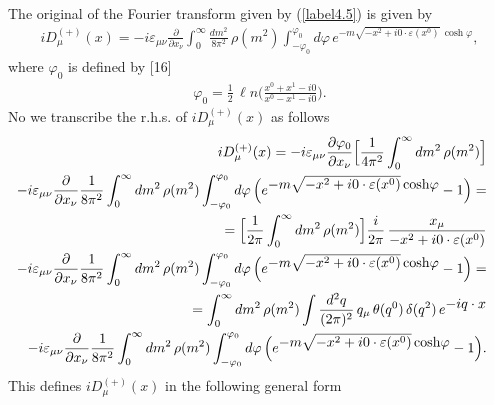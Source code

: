 \documentclass[a4paper,12pt] {article}
\begin{document}
The original of the Fourier transform given by (\ref{label4.5}) is
given by
%
\begin{eqnarray}\label{label4.8}
iD^{(+)}_{\mu}(x) = -i
\varepsilon_{\mu\nu}\frac{\partial}{\partial
x_{\nu}}\int^{\infty}_0\frac{dm^2}{8\pi^2}\,\rho(m^2)
\int^{\varphi_0}_{-\varphi_0}d\varphi\,e^{\textstyle -m\sqrt{-x^2 +
i0\cdot \varepsilon(x^0)}\,{\cosh}\varphi},
\end{eqnarray}
%
where $\varphi_0$ is defined by [16] 
%
\begin{eqnarray}\label{label4.9}
\varphi_0 = \frac{1}{2}\,{\ell n}\Big(\frac{x^0 + x^1 - i0}{x^0 - x^1
- i0}\Big).
\end{eqnarray}
%
No we transcribe the r.h.s. of $iD^{(+)}_{\mu}(x)$ as follows
%
\begin{eqnarray}\label{label4.10}
\hspace{-0.3in}&&iD^{(+)}_{\mu}(x) = -i
\varepsilon_{\mu\nu}\frac{\partial \varphi_0}{\partial
x_{\nu}}\Big[\frac{1}{4\pi^2}\int^{\infty}_0dm^2\,\rho(m^2)\Big]
\nonumber\\ \hspace{-0.3in}&& - i
\varepsilon_{\mu\nu}\frac{\partial}{\partial
x_{\nu}}\frac{1}{8\pi^2}\int^{\infty}_0dm^2\,\rho(m^2)
\int^{\varphi_0}_{-\varphi_0}d\varphi\,\Big(e^{\textstyle -m\sqrt{-x^2
+ i0\cdot \varepsilon(x^0)}\,{\cosh}\varphi} - 1\Big)=\nonumber\\
\hspace{-0.3in}&&= \Big[\frac{1}{2\pi}\int^{\infty}_0
dm^2\,\rho(m^2)\Big] \frac{i}{2\pi}\,\frac{x_{\mu}}{-x^2 + i0\cdot
\varepsilon(x^0)} \nonumber\\ \hspace{-0.3in}&& - i
\varepsilon_{\mu\nu}\frac{\partial}{\partial
x_{\nu}}\frac{1}{8\pi^2}\int^{\infty}_0dm^2\,\rho(m^2)
\int^{\varphi_0}_{-\varphi_0}d\varphi\,\Big(e^{\textstyle -m\sqrt{-x^2
+ i0\cdot \varepsilon(x^0)}\,{\cosh}\varphi} - 1\Big)=\nonumber\\
\hspace{-0.3in}&&= \int^{\infty}_0dm^2\,\rho(m^2)\int
\frac{d^2q}{(2\pi)^2}\,q_{\mu}\,\theta(q^0)\,\delta(q^2)\,e^{\textstyle
-iq\cdot x}\nonumber\\ \hspace{-0.3in}&& - i
\varepsilon_{\mu\nu}\frac{\partial}{\partial
x_{\nu}}\frac{1}{8\pi^2}\int^{\infty}_0dm^2\,\rho(m^2)
\int^{\varphi_0}_{-\varphi_0}d\varphi\,\Big(e^{\textstyle -m\sqrt{-x^2
+ i0\cdot \varepsilon(x^0)}\,{\cosh}\varphi} - 1\Big).
\end{eqnarray}
%
This defines $iD^{(+)}_{\mu}(x)$ in the following general form
\end{document}
